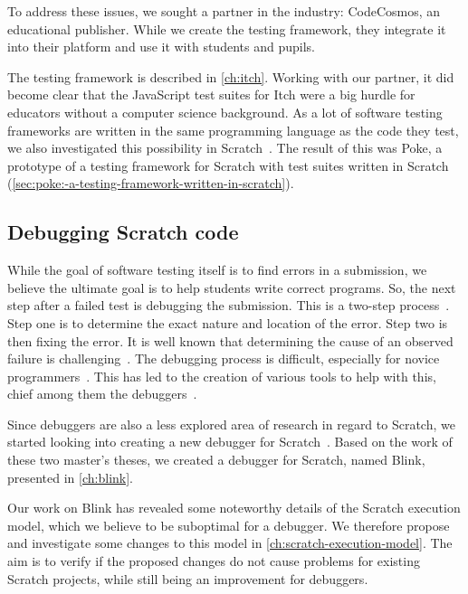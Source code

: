 \documentclass[../main]{subfiles}
\begin{document}
To address these issues, we sought a partner in the industry: CodeCosmos, an educational publisher.
While we create the testing framework, they integrate it into their platform and use it with students and pupils.

The testing framework is described in \cref{ch:itch}.
Working with our partner, it did become clear that the JavaScript test suites for Itch were a big hurdle for educators without a computer science background.
As a lot of software testing frameworks are written in the same programming language as the code they test, we also investigated this possibility in Scratch~\autocite{voetenEenBlokgebaseerdTestframework2023}.
The result of this was Poke, a prototype of a testing framework for Scratch with test suites written in Scratch (\cref{sec:poke:-a-testing-framework-written-in-scratch}).

\subsection{Debugging Scratch code}\label{subsec:debugging-scratch-code}

While the goal of software testing itself is to find errors in a submission, we believe the ultimate goal is to help students write correct programs.
So, the next step after a failed test is debugging the submission.
This is a two-step process~\autocite{myersArtSoftwareTesting2012}.
Step one is to determine the exact nature and location of the error.
Step two is then fixing the error.
It is well known that determining the cause of an observed failure is challenging~\autocite{ammannIntroductionSoftwareTesting2016}.
The debugging process is difficult, especially for novice programmers~\autocite{mccauleyDebuggingReviewLiterature2008}.
This has led to the creation of various tools to help with this, chief among them the debuggers~\autocite{rosenbergHowDebuggersWork1996}.

Since debuggers are also a less explored area of research in regard to Scratch, we started looking into creating a new debugger for Scratch~\autocite{deproftBlinkEenEducatieve2022,goethalsEenTimeTravelling2023}.
Based on the work of these two master's theses, we created a debugger for Scratch, named Blink, presented in \cref{ch:blink}.

Our work on Blink has revealed some noteworthy details of the Scratch execution model, which we believe to be suboptimal for a debugger.
We therefore propose and investigate some changes to this model in \cref{ch:scratch-execution-model}.
The aim is to verify if the proposed changes do not cause problems for existing Scratch projects, while still being an improvement for debuggers.
\end{document}
